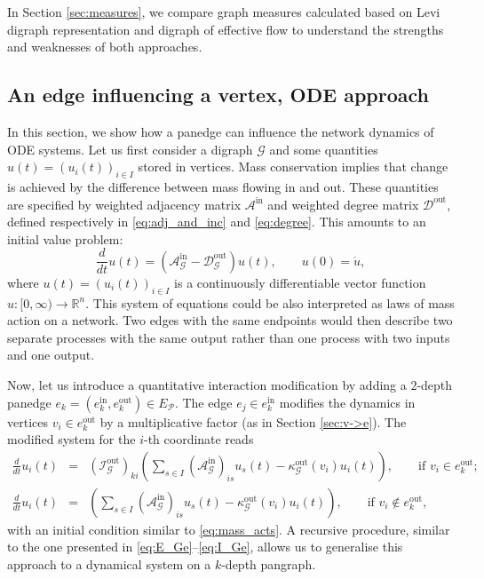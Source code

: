 \documentclass[a4paper,12pt]{article}
\theoremstyle{definition}
\theoremstyle{remark}
\newcommand{\mG}{\mathcal{G}}
\newcommand{\mP}{\mathcal{P}}
\newcommand{\tin}{\mathrm{in}}
\newcommand{\out}{\mathrm{out}}
\begin{document}
In Section \ref{sec:measures}, we compare graph measures calculated based on Levi digraph representation and digraph of effective flow to understand the strengths and weaknesses of both approaches.

\subsection{ An edge influencing a vertex, ODE approach}\label{sec:e->v}

In this section, we show how a panedge can influence the network dynamics of ODE systems. Let us first consider a digraph $\mG$ and some quantities $u(t)=(u_i(t))_{i\in I}$ stored in vertices. Mass conservation implies that change is achieved by the difference between
mass flowing in and out. These quantities are specified by weighted adjacency matrix $\mathcal{A}^{\tin}$ and weighted degree matrix $\mathcal{D}^{\out}$, defined respectively in \eqref{eq:adj_and_inc} and \eqref{eq:degree}. This amounts to an initial value problem:
\begin{equation}\label{eq:mass_acts}
\frac{d}{dt}u(t)=\left(\mathcal{A}_{\mG}^{\tin}-\mathcal{D}_{\mG}^{\out}\right)u(t),\qquad u(0)=\mathring{u},
\end{equation}
where $u(t)=(u_i(t))_{i\in I}$ is a continuously differentiable vector function $u:[0,\infty)\to \mathbb{R}^n.$  This  system of equations could be also interpreted as laws of mass action on a network. Two edges with the same endpoints would then describe two separate processes with the same output rather than one process with two inputs and one output.

Now, let us introduce a quantitative interaction modification by adding a $2$-depth panedge $e_k=(e_k^{\tin},e_k^{\out})\in E_{\mP}$. The edge $e_j\in e_k^{\tin}$ modifies the dynamics in vertices $v_i\in e_k^{\out}$ by a multiplicative factor (as in Section \ref{sec:v->e}). The modified system for the $i$-th coordinate reads
\begin{eqnarray*}
\frac{d}{dt}u_i(t)&=&(\mathcal{I}^{\out}_{\mG})_{ki}\left(\sum_{s\in I}(\mathcal{A}_{\mG}^{\tin})_{is}u_s(t)-\kappa_{\mG}^{\text{out}}(v_i)u_i(t)\right),\qquad \text{if}\,\,v_i\in e_k^{\out};\\
\frac{d}{dt}u_i(t)&=&\left(\sum_{s\in I}(\mathcal{A}^{\tin}_{\mG})_{is}u_s(t)-\kappa_{\mG}^{\text{out}}(v_i)u_i(t)\right),\qquad \text{if}\,\,v_i\notin e_k^{\out},
\end{eqnarray*}
with an initial condition similar to \eqref{eq:mass_acts}. A recursive procedure, similar to the one presented in \eqref{eq:E_Ge}--\eqref{eq:I_Ge}, allows us to generalise this approach to a dynamical system on a $k$-depth pangraph. 
\end{document}
